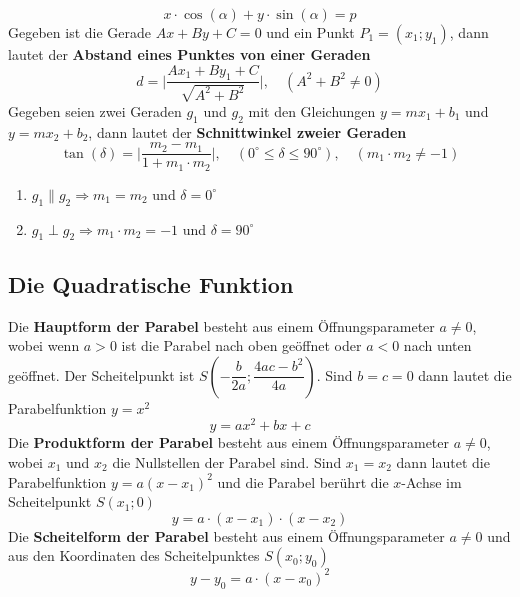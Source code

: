 \begin{equation} 
\boxed{x\cdot \cos\left(\alpha\right)+y\cdot \sin\left(\alpha\right)=p}
\end{equation} 
Gegeben ist die Gerade $Ax+By+C=0$ und ein Punkt $P_1=\left(x_1; y_1\right)$, dann lautet der \textbf{Abstand eines Punktes von einer Geraden}  
\begin{equation}
\boxed{d=\Big\vert\dfrac{Ax_1+By_1+C}{\sqrt{A^2+B^2}}\Big\vert,\quad \left(A^2+B^2\neq 0\right)}
\end{equation}
Gegeben seien zwei Geraden $g_1$ und $g_2$ mit den Gleichungen $y=mx_1+b_1$ und $y=mx_2+b_2$, dann lautet der \textbf{Schnittwinkel zweier Geraden}
\begin{equation}
\boxed{\tan\left(\delta\right)=\Big\vert\dfrac{m_2-m_1}{1+m_1\cdot m_2}\Big\vert,\quad \left(0^{\circ}\leq \delta \leq 90^{\circ}\right),\quad \left(m_1\cdot m_2\neq -1\right)}
\end{equation}
\begin{enumerate}[$(i)$]
\item $g_1\parallel g_2\Longrightarrow m_1=m_2$ und $\delta=0^{\circ}$
\item $g_1\perp g_2\Longrightarrow m_1\cdot m_2=-1$ und $\delta=90^{\circ}$
\end{enumerate}
\subsection{Die Quadratische Funktion}
Die \textbf{Hauptform der Parabel} besteht aus einem Öffnungsparameter $a\neq 0$, wobei wenn $a>0$ ist die Parabel nach oben geöffnet oder $a<0$ nach unten geöffnet. Der Scheitelpunkt ist $S\left(-\dfrac{b}{2a}; \dfrac{4ac-b^2}{4a}\right)$. Sind $b=c=0$ dann lautet die Parabelfunktion $y=x^2$
\begin{equation}
\boxed{y=ax^2+bx+c}
\end{equation}
Die \textbf{Produktform der Parabel} besteht aus einem Öffnungsparameter $a\neq 0$, wobei $x_1$ und $x_2$ die Nullstellen der Parabel sind. Sind $x_1=x_2$ dann lautet die Parabelfunktion $y=a\left(x-x_1\right)^2$ und die Parabel berührt die $x$-Achse im Scheitelpunkt $S\left(x_1; 0\right)$
\begin{equation}
\boxed{y=a\cdot \left(x-x_1\right)\cdot \left(x-x_2\right)}
\end{equation}
Die \textbf{Scheitelform der Parabel} besteht aus einem Öffnungsparameter $a\neq 0$ und aus den Koordinaten des Scheitelpunktes $S\left(x_0;y_0\right)$
\begin{equation}
\boxed{y-y_0=a\cdot \left(x-x_0\right)^2}
\end{equation}
